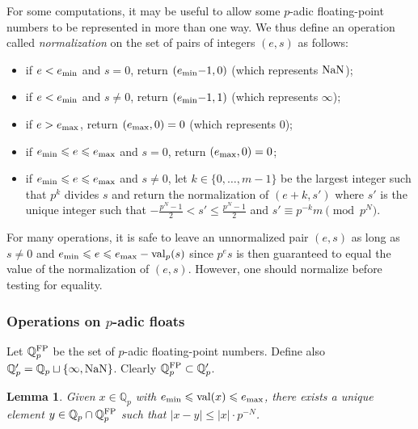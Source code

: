 \documentclass[11pt]{article}
\numberwithin{equation}{section}
\numberwithin{figure}{section}
\renewcommand{\leq}{\leqslant}
\newtheorem{lem}[theo]{Lemma}
\theoremstyle{definition}
\newcommand{\Q}{\mathbb Q}
\newcommand{\Qp}{\Q_p}
\renewcommand{\min}{\text{\rm min}}
\renewcommand{\max}{\text{\rm max}}
\newcommand{\val}{\text{\rm val}}
\newcommand{\nan}{\text{\rm NaN}}
\newcommand{\FP}{\text{\rm FP}}
\newcommand{\QpFP}{\Qp^{\FP}}
\newcommand{\QpNan}{\Qp'}
\begin{document}
For some computations, it may be useful to allow some $p$-adic floating-point 
numbers to be represented in more than one way. We thus define an 
operation called \emph{normalization} on the set of pairs of integers 
$(e,s)$ as follows:
\begin{itemize}
\renewcommand{\itemsep}{0pt}
\item if $e < e_\min$ and $s=0$, return $(e_\min{-}1,0)$ (which represents $\nan$);
\item if $e < e_\min$ and $s \neq 0$, return $(e_\min{-}1,1)$ (which represents $\infty$);
\item if $e > e_\max$, return $(e_\max,0) = 0$ (which represents $0$);
\item if $e_\min \leq e \leq e_\max$ and $s=0$, return $(e_\max,0) = 0$;
\item if $e_\min \leq e \leq e_\max$ and $s \neq 0$, let $k \in 
\{0,\dots,m-1\}$ be the largest integer such that $p^k$ divides $s$ and 
return the normalization of $(e+k, s')$ where $s'$ is the unique integer
such that $-\frac{p^N-1} 2< s' \leq \frac{p^N-1} 2$ and
$s' \equiv p^{-k} m \pmod{p^N}$.
\end{itemize}

\noindent
For many operations, it is safe to leave an unnormalized pair $(e,s)$ 
as long as $s \neq 0$ and $e_\min \leq e \leq e_\max - \val_p(s)$ since
$p^e s$ is then guaranteed to equal the value of the normalization of 
$(e,s)$. However, one should normalize before testing for equality.

\subsubsection{Operations on $p$-adic floats}

Let $\QpFP$ be the set of $p$-adic floating-point numbers. Define also 
$\QpNan = \Qp \sqcup \{\infty, \nan\}$. Clearly $\QpFP \subset \QpNan$.

\begin{lem}
\label{lem:roundingFP}
Given $x \in \Qp$ with $e_\min \leq \val(x) \leq e_\max$, there
exists a unique element $y \in \Qp \cap \QpFP$ such that
$|x-y| \leq |x| \cdot p^{-N}$.
\end{lem}
\end{document}
